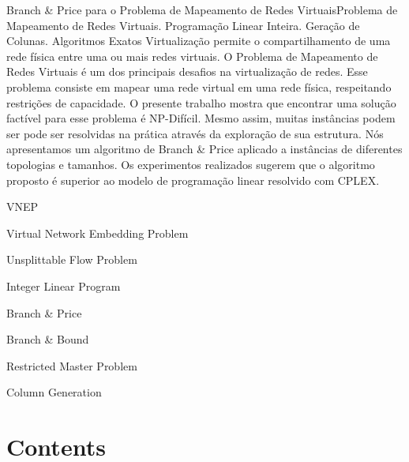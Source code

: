 \documentclass[ppgc,diss,english]{iiufrgs}
\begin{document}
\begin{englishabstract}{Branch \& Price para o Problema de Mapeamento de Redes Virtuais}{Problema de Mapeamento de Redes Virtuais. Programação Linear Inteira. Geração de Colunas. Algoritmos Exatos}
Virtualização permite o compartilhamento de uma rede física entre uma ou mais redes virtuais.
O Problema de Mapeamento de Redes Virtuais é um dos principais desafios na virtualização de redes.
Esse problema consiste em mapear uma rede virtual em uma rede física, respeitando restrições de capacidade.
O presente trabalho mostra que encontrar uma solução factível para esse problema é NP-Difícil.
Mesmo assim, muitas instâncias podem ser pode ser resolvidas na prática através da exploração de sua estrutura.
Nós apresentamos um algoritmo de Branch \& Price aplicado a instâncias de diferentes topologias e tamanhos.
Os experimentos realizados sugerem que o algoritmo proposto é superior ao modelo de programação linear resolvido com CPLEX.
\end{englishabstract}

\listoffigures

\listoftables

\listofalgorithms
{}

\begin{listofabbrv}{VNEP}
        \item[VNEP] Virtual Network Embedding Problem
        \item[UFP]  Unsplittable Flow Problem
        \item[ILP]  Integer Linear Program
        \item[B\&P] Branch \& Price
        \item[B\&B] Branch \& Bound
        \item[RMP]  Restricted Master Problem
        \item[CG]   Column Generation
\end{listofabbrv}

\newpage

\chapter*{Contents}
\makeatletter
{}
\makeatother















%
%




\end{document}
